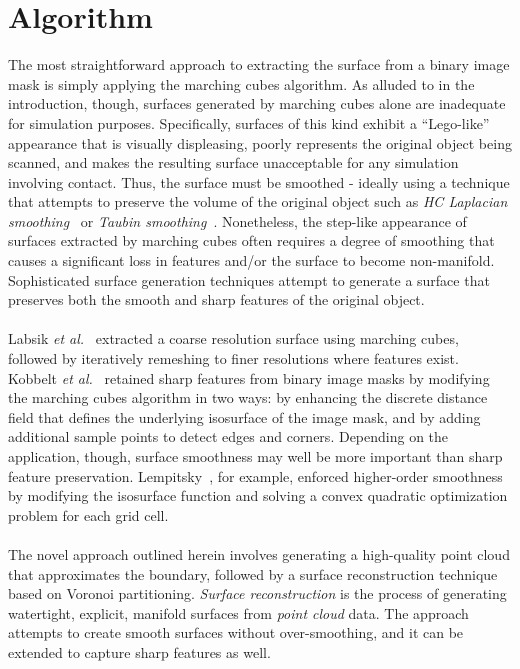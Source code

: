 \section{Algorithm}
%
The most straightforward approach to extracting the surface from a binary image mask is simply applying the marching cubes algorithm. As alluded to in the introduction, though, surfaces generated by marching cubes alone are inadequate for simulation purposes. Specifically, surfaces of this kind exhibit a ``Lego-like'' appearance that is visually displeasing, poorly represents the original object being scanned, and makes the resulting surface unacceptable for any simulation involving contact. Thus, the surface must be smoothed - ideally using a technique that attempts to preserve the volume of the original object such as \textit{HC Laplacian smoothing}~\cite{vollmer_1999} or \textit{Taubin smoothing}~\cite{taubin_1995}. Nonetheless, the step-like appearance of surfaces extracted by marching cubes often requires a degree of smoothing that causes a significant loss in features and/or the surface to become non-manifold. Sophisticated surface generation techniques attempt to generate a surface that preserves both the smooth and sharp features of the original object. \\ \\
Labsik \textit{et al.}~\cite{labsik_2002} extracted a coarse resolution surface using marching cubes, followed by iteratively remeshing to finer resolutions where features exist. Kobbelt \textit{et al.}~\cite{kobbelt_2001} retained sharp features from binary image masks by modifying the marching cubes algorithm in two ways: by enhancing the discrete distance field that defines the underlying isosurface of the image mask, and by adding additional sample points to detect edges and corners. Depending on the application, though, surface smoothness may well be more important than sharp feature preservation. Lempitsky~\cite{lempitsky_2010}, for example, enforced higher-order smoothness by modifying the isosurface function and solving a convex quadratic optimization problem for each grid cell. \\ \\ 
The novel approach outlined herein involves generating a high-quality point cloud that approximates the boundary, followed by a surface reconstruction technique based on Voronoi partitioning. \textit{Surface reconstruction} is the process of generating watertight, explicit, manifold surfaces from \textit{point cloud} data. The approach attempts to create smooth surfaces without over-smoothing, and it can be extended to capture sharp features as well.
